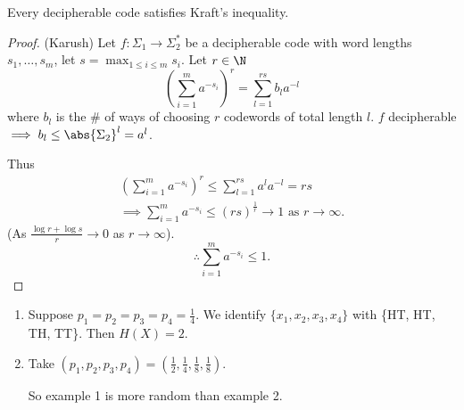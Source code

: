 \documentclass{article}
\begin{document}
\begin{nthm}[McMillan]
    Every decipherable code satisfies Kraft's inequality.
\end{nthm}

\begin{proof}(Karush)
    Let $f: \Sigma_1 \to \Sigma_2^*$ be a decipherable code with word lengths $s_1, \dotsc, s_m$, let $s = \max_{1 \leq i \leq m} s_i$.
    Let $r \in \N$
    \begin{equation*}
        \left(\sum_{i=1}^m a^{-s_i}\right)^r = \sum_{l=1}^{rs} b_l a^{-l}
    \end{equation*}
    where $b_l$ is the \# of ways of choosing $r$ codewords of total length $l$. $f$ decipherable $\implies b_l \leq \abs{\Sigma_2}^l = a^l$.

    Thus \begin{align*}\left(\sum_{i=1}^m a^{-s_i}\right)^r \leq \sum_{l=1}^{rs} a^l a^{-l} = rs \\
    \implies \sum_{i=1}^m a^{-s_i} \leq (rs)^{\frac{1}{r}} \to 1 \text{ as } r \to \infty.
    \end{align*}
    (As $\frac{\log r + \log s}{r} \to 0$ as $r \to \infty$).
    \begin{equation*}
        \therefore \sum_{i=1}^m a^{-s_i} \leq 1.
    \end{equation*}
\end{proof}

\begin{eg}
    \leavevmode
    \begin{enumerate}[label=\arabic*.]
        \item Suppose $p_1 = p_2 = p_3 = p_4 = \frac{1}{4}$. We identify $\{x_1, x_2, x_3, x_4\}$ with \{HT, HT, TH, TT\}. Then $H(X) = 2$.
        \item Take $(p_1, p_2, p_3, p_4) = (\frac{1}{2}, \frac{1}{4}, \frac{1}{8}, \frac{1}{8})$.
            \begin{center}
            \end{center}
            So example 1 is more random than example 2.
    \end{enumerate}
\end{eg}
\end{document}
